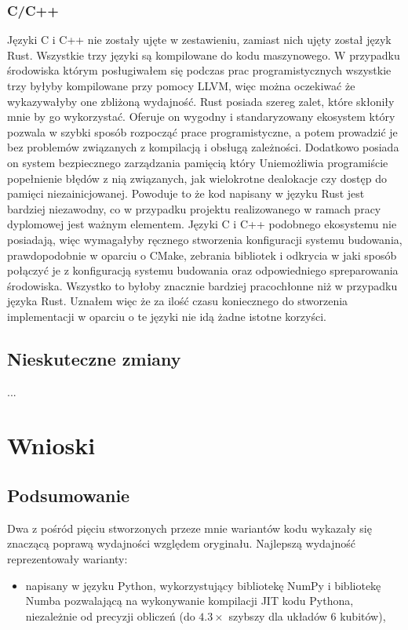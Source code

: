 \documentclass[11pt, a4paper]{article}
\begin{document}
\begin{sloppypar}
    \subsubsection{C/C++}
    Języki C i C++ nie zostały ujęte w zestawieniu, zamiast nich ujęty został język Rust.
    Wszystkie trzy języki są kompilowane do kodu maszynowego. W przypadku środowiska którym
    posługiwałem się podczas prac programistycznych wszystkie trzy byłyby kompilowane przy
    pomocy LLVM, więc można oczekiwać że wykazywałyby one zbliżoną wydajność. Rust posiada
    szereg zalet, które skłoniły mnie by go wykorzystać. Oferuje on wygodny i standaryzowany
    ekosystem który pozwala w szybki sposób rozpocząć prace programistyczne, a potem
    prowadzić je bez problemów związanych z kompilacją i obsługą zależności. Dodatkowo posiada
    on system bezpiecznego zarządzania pamięcią który Uniemożliwia programiście popełnienie
    błędów z nią związanych, jak wielokrotne dealokacje czy dostęp do pamięci
    niezainicjowanej. Powoduje to że kod napisany w języku Rust jest bardziej niezawodny,
    co w przypadku projektu realizowanego w ramach pracy dyplomowej jest ważnym
    elementem. Języki C i C++ podobnego ekosystemu nie posiadają, więc wymagałyby
    ręcznego stworzenia konfiguracji systemu budowania, prawdopodobnie w oparciu o CMake,
    zebrania bibliotek i odkrycia w jaki sposób połączyć je z konfiguracją systemu
    budowania oraz odpowiedniego spreparowania środowiska. Wszystko to byłoby znacznie bardziej
    pracochłonne niż w przypadku języka Rust. Uznałem więc że za ilość czasu koniecznego
    do stworzenia implementacji w oparciu o te języki nie idą żadne istotne korzyści.

    \subsection{Nieskuteczne zmiany}
    ...

    \section{Wnioski}
    \subsection{Podsumowanie}
    Dwa z pośród pięciu stworzonych przeze mnie wariantów kodu wykazały się znaczącą poprawą
    wydajności względem oryginału. Najlepszą wydajność reprezentowały warianty:
    \begin{itemize}
      \item napisany w języku Python, wykorzystujący bibliotekę NumPy i bibliotekę Numba
        pozwalającą na wykonywanie kompilacji JIT kodu Pythona, niezależnie od precyzji obliczeń
        (do $4.3\times$ szybszy dla układów 6 kubitów),


\end{itemize}
\end{sloppypar}
\end{document}
